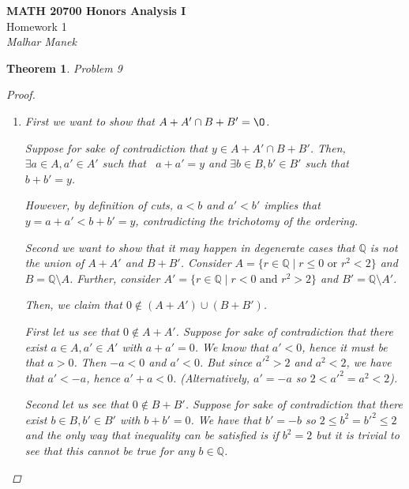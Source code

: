 \documentclass[11pt]{article}
\newcommand{\bbQ}{\mathbb{Q}}
\renewcommand{\emptyset}{\O}
\renewcommand{\_}[1]{\underline{ #1 }}
\newtheorem*{theorem*}{Theorem}
\theoremstyle{definition}
\numberwithin{equation}{subsection}
\begin{document}
\begin{center}
    {\LARGE\bfseries MATH 20700 Honors Analysis I}\\[6pt]
    {\Large Homework 1}\\[6pt]
    {\Large\itshape Malhar Manek}
\end{center}

\bigskip

\newcommand{\problem}[2]{
    \begin{theorem*}{Problem #1}
    \begin{proof}
    #2
    \end{proof}
    \end{theorem*}
    \bigskip
}

\problem{9}{
\begin{enumerate}
    \item[a)] First we want to show that $A + A' \cap B + B' = \emptyset$. 
    
    Suppose for sake of contradiction that $y \in A + A' \cap B + B'$. Then, $\exists a \in A, a' \in A'$ such that \ $a + a' = y$ and $\exists b \in B, b' \in B'$ such that \ $b + b' = y$. 
    
    However, by definition of cuts, $a < b$ and $a' < b'$ implies that $y = a + a' < b + b' = y$, contradicting the trichotomy of the ordering.

    Second we want to show that  it may happen in degenerate cases that $\bbQ$ is not the union of $A + A'$ and $B + B'$. Consider $A=\{r\in \bbQ \mid r\leq 0 \text{ or } r^2<2\}$ and $B = \bbQ \setminus A$. Further, consider $A' = \{r\in \bbQ \mid r<0 \text{ and } r^2>2\}$ and $B'=\bbQ \setminus A'$.

    Then, we claim that $0 \notin (A+A') \cup (B+B')$. 

    First let us see that $0 \notin A +A'$. Suppose for sake of contradiction that there exist $a\in A, a'\in A'$ with $a+a'=0$. We know that $a'<0$, hence it must be that $a>0$. Then $-a<0$ and $a'<0$. But since $a'^2>2$ and $a^2<2$, we have that $a'<-a$, hence $a'+a<0$. (Alternatively, $a'=-a$ so $2<a'^2=a^2<2$).

    Second let us see that $0 \notin B +B'$. Suppose for sake of contradiction that there exist $b\in B, b'\in B'$ with $b+b'=0$. We have that $b'=-b$ so $2\leq b^2=b'^2\leq 2$ and the only way that inequality can be satisfied is if $b^2=2$ but it is trivial to see that this cannot be true for any $b\in \bbQ$.


\end{enumerate}}
\end{document}
